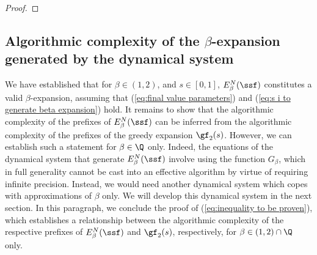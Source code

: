 \begin{proof}
\end{proof}

\subsection{\texorpdfstring{Algorithmic complexity of the $\beta$-expansion generated by the dynamical system}{}}


We have established that for $\beta \in (1,2)$, and $s \in [0,1]$, $E_\beta^N(\ssf)$ constitutes a valid $\beta$-expansion, assuming that (\ref{eq:final value parameters}) and (\ref{eq:s i to generate beta expansion}) hold. It remains to show that the algorithmic complexity of the prefixes of $E_\beta^N(\ssf)$ can be inferred from the algorithmic complexity of the prefixes of the greedy expansion $\gf_2(s)$. However, we can establish such a statement for $\beta \in \Q$ only. Indeed, the equations of the dynamical system that generate $E_\beta^N(\ssf)$ involve using the function $G_\beta$, which in full generality cannot be cast into an effective algorithm by virtue of requiring infinite precision. Instead, we would need another dynamical system which copes with approximations of $\beta$ only. We will develop this dynamical system in the next section. In this paragraph, we conclude the proof of (\ref{eq:inequality to be proven}), which establishes a relationship between the algorithmic complexity of the respective prefixes of $E_\beta^N(\ssf)$ and $\gf_2(s)$, respectively, for $\beta \in (1,2) \cap \Q$ only.

